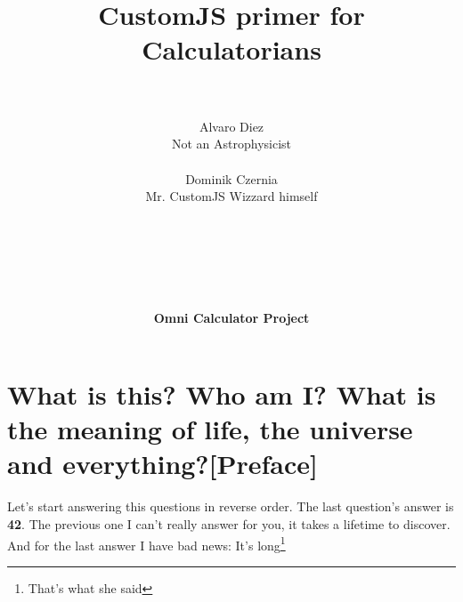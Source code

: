\documentclass[11pt,a4paper,oldfontcommands]{memoir}
\begin{document}
%
%
\thispagestyle{empty}

{%

\centering
\title{ \normalsize \textsc{}
		\\ [2.0cm]
		\hline \vspace{10pt} \\
		\huge \textbf{CustomJS primer for Calculatorians\textsuperscript{\textregistered}} \vspace{5pt}
		\textbf{\hline}{\hline} \\ [0.5cm]
		\large \vspace{200pt}\\}		}
		


\author{\LARGE Alvaro Diez \\
		Not an Astrophysicist\texttrademark \\ \\
		\LARGE Dominik Czernia \\
		Mr. CustomJS Wizzard himself \\ \\ \\ \\ \\ \\ \\
		\LARGE {\textbf{Omni Calculator Project}} \vspace{-50pt}
} 
		
\maketitle
\noalign
\clearpage

\tableofcontents

\clearpage


\chapter{What is this? Who am I? What is the meaning of life, the universe and everything?[Preface]}
    \label{preface}

Let's start answering this questions in reverse order. The last question's answer is \textbf{42}. The previous one I can't really answer for you, it takes a lifetime to discover. And for the last answer I have bad news: It's long\footnote{That's what she said}
\end{document}
